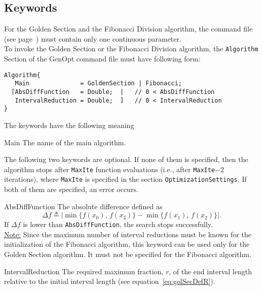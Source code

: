 
\subsection{Keywords}
For the Golden Section and the Fibonacci Division algorithm, the command file (see page~\pageref{par:comFil}) must contain only one continuous parameter.\\

To invoke the Golden Section or the Fibonacci Division algorithm, the \texttt{Algorithm} Section of the GenOpt command file must have following form:
\begin{lstlisting}
Algorithm{
   Main              = GoldenSection | Fibonacci;
  [AbsDiffFunction   = Double;  |   // 0 < AbsDiffFunction
   IntervalReduction = Double;  ]   // 0 < IntervalReduction
}
\end{lstlisting}
\pagebreak[2]
\noindent The keywords have the following meaning
\begin{codedescription}
\item[Main]
The name of the main algorithm.
\end{codedescription}
The following two keywords are optional. If none of them is specified, then the algorithm stops after \texttt{MaxIte} function evaluations (i.e., after \texttt{MaxIte}$-2$ iterations), where \texttt{MaxIte} is specified in the section \texttt{OptimizationSettings}. If both of them are specified, an error occurs.
\begin{codedescription}
\item[AbsDiffFunction]
The absolute difference defined as
\begin{equation}
\Delta f \triangleq | \min \{ f(x_0),\, f(x_3) \} - \min \{ f(x_1), \, f(x_2) \}|.
\end{equation}
If $\Delta f$ is lower than \texttt{AbsDiffFunction}, the search stops successfully.\\
\underline{Note:} Since the maximum number of interval reductions must be known for the initialization of the Fibonacci algorithm, this keyword can be used only for the Golden Section algorithm. It must not be specified for the Fibonacci algorithm.
\item[IntervalReduction]
The required maximum fraction, $r$, of the end interval length relative to the initial interval length (see equation~\eqref{eq:golSecDefR}).
\end{codedescription}
